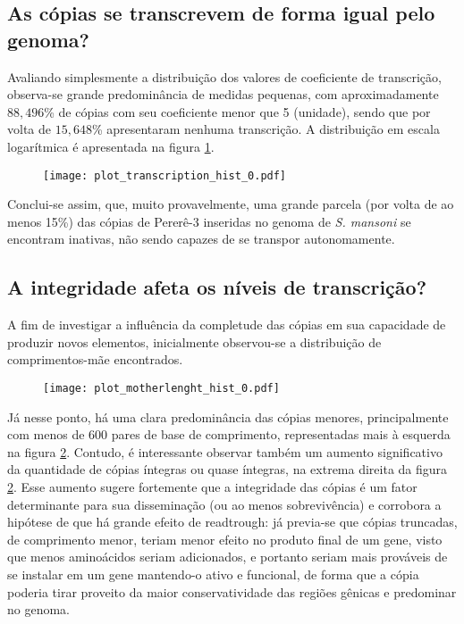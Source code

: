 \documentclass[12pt]{article}
\begin{document}
\begin{multicols}{2}
\subsection{As cópias se transcrevem de forma igual pelo genoma?}
	Avaliando simplesmente a distribuição dos valores de coeficiente de transcrição, observa-se grande predominância de medidas pequenas, com aproximadamente \(88,496\)\% de cópias com seu coeficiente menor que 5 (unidade), sendo que por volta de \(15,648\)\% apresentaram nenhuma transcrição. A distribuição em escala logarítmica é apresentada na figura \ref{histtranscription}.

\begin{figure}[H]
	\label{histtranscription}
	\centering
	\texttt{[image: plot\_transcription\_hist\_0.pdf]}
\end{figure}

	Conclui-se assim, que, muito provavelmente, uma grande parcela (por volta de ao menos 15\%) das cópias de Pererê-3 inseridas no genoma de \textit{S. mansoni} se encontram inativas, não sendo capazes de se transpor autonomamente.

\subsection{A integridade afeta os níveis de transcrição?}

A fim de investigar a influência da completude das cópias em sua capacidade de produzir novos elementos, inicialmente observou-se a distribuição de comprimentos-mãe encontrados.\\

\begin{figure}[H]
  \label{mlhist}
  \centering
  \texttt{[image: plot\_motherlenght\_hist\_0.pdf]}
\end{figure}

Já nesse ponto, há uma clara predominância das cópias menores, principalmente com menos de 600 pares de base de comprimento, representadas mais à esquerda na figura \ref{mlhist}. Contudo, é interessante observar também um aumento significativo da quantidade de cópias íntegras ou quase íntegras, na extrema direita da figura \ref{mlhist}. Esse aumento sugere fortemente que a integridade das cópias é um fator determinante para sua disseminação (ou ao menos sobrevivência) e corrobora a hipótese de que há grande efeito de readtrough: já previa-se que cópias truncadas, de comprimento menor, teriam menor efeito no produto final de um gene, visto que menos aminoácidos seriam adicionados, e portanto seriam mais prováveis de se instalar em um gene mantendo-o ativo e funcional, de forma que a cópia poderia tirar proveito da maior conservatividade das regiões gênicas e predominar no genoma.\\


\end{multicols}
\end{document}
